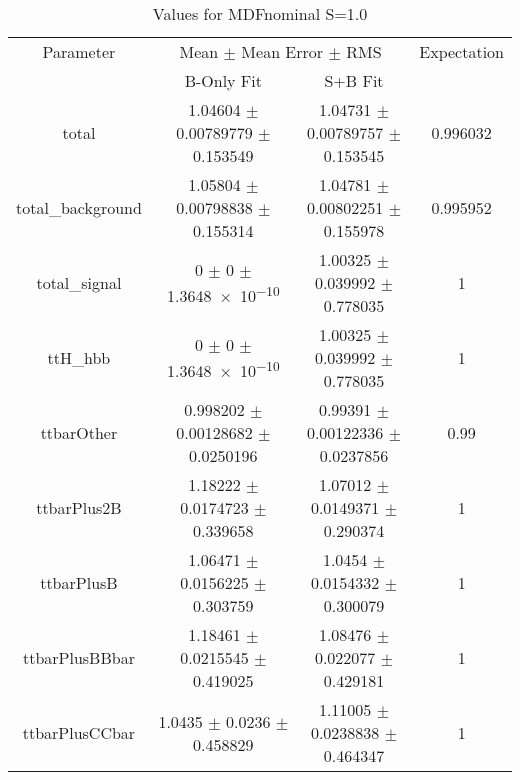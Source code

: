 \begin{table}
\centering
\caption{Values for MDFnominal S=1.0}
\begin{tabular}{cccc}
\toprule
Parameter & \multicolumn{2}{c}{Mean $\pm$ Mean Error $\pm$ RMS} & Expectation\\
 & B-Only Fit & S+B Fit & \\
\midrule
total & \num{1.04604} $\pm$ \num{0.00789779} $\pm$ \num{0.153549} & \num{1.04731} $\pm$ \num{0.00789757} $\pm$ \num{0.153545} & \num{0.996032}\\
total\_background & \num{1.05804} $\pm$ \num{0.00798838} $\pm$ \num{0.155314} & \num{1.04781} $\pm$ \num{0.00802251} $\pm$ \num{0.155978} & \num{0.995952}\\
total\_signal & \num{0} $\pm$ \num{0} $\pm$ \num{1.3648e-10} & \num{1.00325} $\pm$ \num{0.039992} $\pm$ \num{0.778035} & \num{1}\\
ttH\_hbb & \num{0} $\pm$ \num{0} $\pm$ \num{1.3648e-10} & \num{1.00325} $\pm$ \num{0.039992} $\pm$ \num{0.778035} & \num{1}\\
ttbarOther & \num{0.998202} $\pm$ \num{0.00128682} $\pm$ \num{0.0250196} & \num{0.99391} $\pm$ \num{0.00122336} $\pm$ \num{0.0237856} & \num{0.99}\\
ttbarPlus2B & \num{1.18222} $\pm$ \num{0.0174723} $\pm$ \num{0.339658} & \num{1.07012} $\pm$ \num{0.0149371} $\pm$ \num{0.290374} & \num{1}\\
ttbarPlusB & \num{1.06471} $\pm$ \num{0.0156225} $\pm$ \num{0.303759} & \num{1.0454} $\pm$ \num{0.0154332} $\pm$ \num{0.300079} & \num{1}\\
ttbarPlusBBbar & \num{1.18461} $\pm$ \num{0.0215545} $\pm$ \num{0.419025} & \num{1.08476} $\pm$ \num{0.022077} $\pm$ \num{0.429181} & \num{1}\\
ttbarPlusCCbar & \num{1.0435} $\pm$ \num{0.0236} $\pm$ \num{0.458829} & \num{1.11005} $\pm$ \num{0.0238838} $\pm$ \num{0.464347} & \num{1}\\
\bottomrule
\end{tabular}
\end{table}